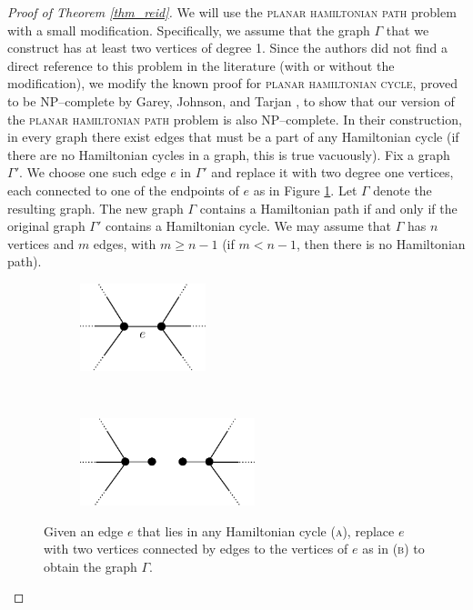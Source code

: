\documentclass[12pt]{amsart}
\theoremstyle{definition}
\theoremstyle{remark}
\begin{document}
\begin{proof}[Proof of Theorem \ref{thm_reid}]
We will use the \textsc{planar hamiltonian path} problem with a small modification.  Specifically, we assume that the graph $\Gamma$ that we construct has at least two vertices of degree 1.  Since the authors did not find a direct reference to this problem in the literature (with or without the modification), we modify the known proof for \textsc{planar hamiltonian cycle}, proved to be NP--complete by Garey, Johnson, and Tarjan \cite{GareyJohnsonTarjan1}, to show that our version of the \textsc{planar hamiltonian path} problem is also NP--complete.  In their construction, in every graph there exist edges that must be a part of any Hamiltonian cycle (if there are no Hamiltonian cycles in a graph, this is true vacuously). Fix a graph $\Gamma'$. We choose one such edge $e$ in $\Gamma'$ and replace it with two degree one vertices, each connected to one of the endpoints of $e$ as in Figure \ref{edgerep}.  Let $\Gamma$ denote the resulting graph. The new graph $\Gamma$ contains a Hamiltonian path if and only if the original graph $\Gamma'$ contains a Hamiltonian cycle.  We may assume that $\Gamma$ has $n$ vertices and $m$ edges, with $m \ge n-1$ (if $m < n-1$, then there is no Hamiltonian path).


\begin{figure}[ht]
\centering
    \begin{subfigure}[b]{0.4\textwidth}
        \centering
        \includegraphics[height=1.0in]{edgerep1.png}
        \caption{}
    \end{subfigure}%
~~~~~
    \begin{subfigure}[b]{0.5\textwidth}
        \centering
        \includegraphics[height=1.0in]{edgerep2.png}
        \caption{}
    \end{subfigure}
\caption{Given an edge $e$ that lies in any Hamiltonian cycle (\textsc{a}), replace $e$ with two vertices connected by edges to the vertices of $e$ as in (\textsc{b}) to obtain the graph $\Gamma$.}
\label{edgerep}


\end{figure}
\end{proof}
\end{document}
